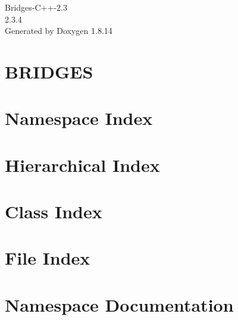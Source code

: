 \documentclass[twoside]{book}
\newcommand{\+}{\discretionary{\mbox{\scriptsize$\hookleftarrow$}}{}{}}
\newcommand{\clearemptydoublepage}{%
  \newpage{\pagestyle{empty}\cleardoublepage}%
}
\begin{document}
\hypersetup{pageanchor=false,
             bookmarksnumbered=true,
             pdfencoding=unicode
            }
\begin{titlepage}
\vspace*{7cm}
\begin{center}%
{\Large Bridges-\/\+C++-\/2.3 \\[1ex]\large 2.\+3.\+4 }\\
\vspace*{1cm}
{\large Generated by Doxygen 1.8.14}\\
\end{center}
\end{titlepage}
\clearemptydoublepage
{}
\tableofcontents
\clearemptydoublepage
{}
\hypersetup{pageanchor=true}

\chapter{B\+R\+I\+D\+G\+ES}
\label{index}\hypertarget{index}{}
\chapter{Namespace Index}

\chapter{Hierarchical Index}

\chapter{Class Index}

\chapter{File Index}

\chapter{Namespace Documentation}




\end{document}
